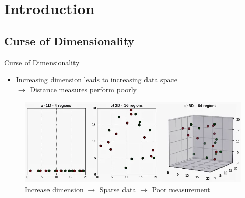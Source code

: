 \section{Introduction}

\subsection{Curse of Dimensionality}

\begin{frame}{Curse of Dimensionality}
    \begin{itemize}
        \item Increasing dimension leads to increasing data space\\$\rightarrow$ Distance measures perform poorly
    \end{itemize}

    \begin{figure}
        \centering
        \includegraphics[width=0.9\linewidth]{img/dimension.png}
        \caption{Increase dimension $\to$ Sparse data $\to$ Poor measurement}
        \label{fig:enter-label}
    \end{figure}
\end{frame}

